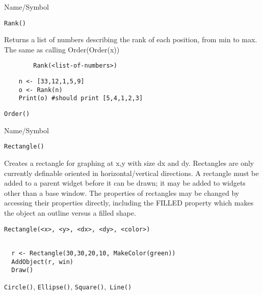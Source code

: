 \begin{desc}{Name/Symbol}
\item[Name/Symbol]	\verb+Rank()+

\item[Description]	Returns a list of numbers describing the rank of
  each position, from min to max.  The same as calling Order(Order(x))

\item[Usage]
\begin{verbatim}
		Rank(<list-of-numbers>)
\end{verbatim}

\item[Example]	
\begin{verbatim}
	n <- [33,12,1,5,9]
  	o <- Rank(n)
    Print(o) #should print [5,4,1,2,3]
\end{verbatim}

\item[See Also]	\verb+Order()+
\end{desc}

\rl



\begin{desc}{Name/Symbol}
\item[Name/Symbol]	\verb+Rectangle()+
  
\item[Description]	Creates a rectangle for graphing at x,y with size
  dx and dy. Rectangles are only currently definable oriented in
  horizontal/vertical directions.  A rectangle  must be added
  to a parent widget before it can be drawn; it may be added to
  widgets other than a base window.  The properties of rectangles may be
  changed by accessing their properties directly, including the FILLED
  property which makes the object an outline versus a filled shape.

\item[Usage]
\begin{verbatim}
Rectangle(<x>, <y>, <dx>, <dy>, <color>)
\end{verbatim}

\item[Example]	
\begin{verbatim}
  
  r <- Rectangle(30,30,20,10, MakeColor(green))
  AddObject(r, win)
  Draw()

\end{verbatim}
\item[See Also]	 \verb+Circle()+, \verb+Ellipse()+, \verb+Square()+,\verb+ Line()+
\end{desc}

